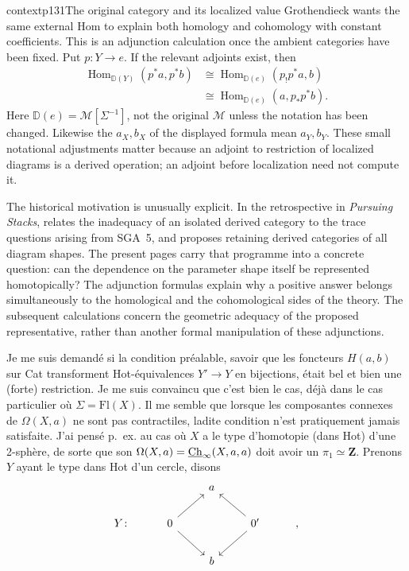 \begin{dcomment}{context}{p131}{The original category and its localized value}
Grothendieck wants the same external Hom to explain both homology and cohomology with constant coefficients. This is an adjunction calculation once the ambient categories have been fixed. Put $p:Y\to e$. If the relevant adjoints exist, then
\[
\begin{aligned}
 \operatorname{Hom}_{\mathbb D(Y)}(p^*a,p^*b)
 &\cong\operatorname{Hom}_{\mathbb D(e)}(p_!p^*a,b)\\
 &\cong\operatorname{Hom}_{\mathbb D(e)}(a,p_*p^*b).
\end{aligned}
\]
Here $\mathbb D(e)=\mathcal M[\Sigma^{-1}]$, not the original $\mathcal M$ unless the notation has been changed. Likewise the $a_X,b_X$ of the displayed formula mean $a_Y,b_Y$. These small notational adjustments matter because an adjoint to restriction of localized diagrams is a derived operation; an adjoint before localization need not compute it.

The historical motivation is unusually explicit. In the retrospective in \emph{Pursuing Stacks}, \citet[\S69, pp.~1--2]{Grothendieck1983} relates the inadequacy of an isolated derived category to the trace questions arising from SGA~5, and proposes retaining derived categories of all diagram shapes. The present pages carry that programme into a concrete question: can the dependence on the parameter shape itself be represented homotopically? The adjunction formulas explain why a positive answer belongs simultaneously to the homological and the cohomological sides of the theory. The subsequent calculations concern the geometric adequacy of the proposed representative, rather than another formal manipulation of these adjunctions.
\end{dcomment}


Je me suis demandé si la condition préalable, savoir que les foncteurs $H(a,b)$ sur Cat transforment Hot-équivalences $Y'\longrightarrow Y$ en bijections, était bel et bien une (forte) restriction. Je me suis convaincu que c'est bien le cas, déjà dans le cas particulier où $\Sigma=\mathrm{Fl}(X)$. Il me semble que lorsque les composantes connexes de $\Omega(X,a)$ ne sont pas contractiles, ladite condition n'est pratiquement jamais satisfaite. J'ai pensé p.~ex. au cas où $X$ a le type d'homotopie (dans Hot) d'une 2-sphère, de sorte que son $\Omega(X,a)=\underline{\mathrm{Ch}}_\infty(X,a,a)$ doit avoir un $\pi_1\simeq\mathbf{Z}$. Prenons $Y$ ayant le type dans Hot d'un cercle, disons
\[
\begin{tikzcd}
 & & a & & \\
Y\colon & 0 \arrow[ur] \arrow[dr] & & 0' \arrow[ul] \arrow[dl] & , \\
 & & b & &
\end{tikzcd}
\]

